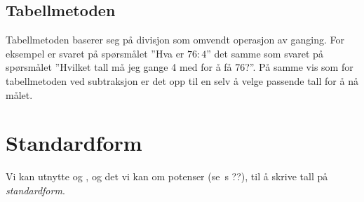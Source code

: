 \subsection{Tabellmetoden}
Tabellmetoden baserer seg på divisjon som omvendt operasjon av ganging. For eksempel er svaret på spørsmålet ''Hva er $ {76:4} $'' det samme som svaret på spørsmålet ''Hvilket tall må jeg gange 4 med for å få 76?''. På samme vis som for tabellmetoden ved subtraksjon er det opp til en selv å velge passende tall for å nå målet.
\begin{center}
	\parbox{0.35\linewidth}{
		} \qquad
\parbox{0.35\linewidth}{
	} \vsk

\parbox{0.415\linewidth}{
}
\end{center}
\section{Standardform}
Vi kan utnytte  og , og det vi kan om potenser (se \mb\,s ??), til å skrive tall på \textit{standardform}. \vsk

